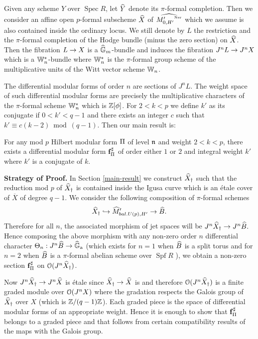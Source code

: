 \documentclass{amsart}
\def \hG{\widehat{\mathbb{G}}_{\mathrm{a}}}
\newcommand{\inj}{\hookrightarrow}
\newcommand{\ov}[1]{\overline{#1}}
\numberwithin{equation}{section}
\DeclareMathOperator{\Spec}{\mathrm{Spec}}
\DeclareMathOperator{\Spf}{\mathrm{Spf}}
\begin{document}
Given any scheme $Y$ over $\Spec R$, let 
$\widehat{Y}$ denote its $\pi$-formal completion. 
Then we consider an affine open $p$-formal subscheme $\widehat{X}$ of 
$\widehat{{M'_{0,H'}}^{\mbox{\tiny Ner}}}$ which we assume is also contained inside the ordinary locus.
We still denote by $L$ the restriction and the $\pi$-formal completion of 
the
Hodge bundle (minus the zero section) on $\widehat{X}$.  Then the fibration $L \rightarrow 
X$ is a $\widehat{\mathbb{G}}_m$-bundle and induces the fibration $J^nL \rightarrow J^nX$ which is a
$\mathbb{W}_n^*$-bundle where $\mathbb{W}_n^*$ is the $\pi$-formal group scheme of the
multiplicative units of the Witt vector scheme $\mathbb{W}_n$.

The differential modular forms of order $n$ are sections of $J^nL$. The 
weight space of such differential modular forms are precisely the 
multiplicative characters of the $\pi$-formal scheme $\mathbb{W}_n^*$ which is 
$\mathbb{Z}[\phi]$.
For $2 < k < p$ we define $k'$ as its conjugate if $0 < k' <q-1$ and there 
exists an integer $c$ such that $k' \equiv c(k-2) \bmod (q-1)$. Then our main 
result is:

\begin{theorem}
\label{main-thm-new}
For any mod $p$ Hilbert modular form $\Pi$ of level $\mathfrak{n}$ and weight 
$2 < k < p $,
there exists a differential modular form ${\bold f}^\sharp_{{\tiny \Pi}}$ of order either $1$ or $2$
and integral weight $k'$ where $k'$ is a conjugate of $k$.
\end{theorem}

{\bf Strategy of Proof.} 
In Section \ref{main-result} we construct $\widehat{X}_\dagger$ such that 
the reduction mod $p$ of $\widehat{X}_\dagger$ is contained inside the Igusa curve
which is an \'{e}tale cover of $\ov{X}$ of degree $q-1$. We
consider the following composition of $\pi$-formal schemes
\begin{equation}
\Xdag \inj \MU \map \wh{B}.
\end{equation}
Therefore for all $n$, the associated morphism of jet spaces will be
$J^n\widehat{X}_\dagger \rightarrow J^n \widehat{B}.$
Hence composing the above morphism with any non-zero order $n$ differential 
character $\Theta_n:J^n\wh{B} \map \hG$ (which exists for $n=1$ when $\widehat{B}$
is a split torus and for $n=2$ when $\widehat{B}$ is a $\pi$-formal abelian
scheme over $\Spf R$ \cite{MR1358979}),
we obtain a non-zero section ${\bold f}^\sharp_{{\tiny \Pi}}$ on $\mathcal{O}(J^n\widehat{X}_\dagger)$.

Now $J^n\widehat{X}_\dagger \rightarrow J^n\widehat{X}$ is \'{e}tale since $\widehat{X}_\dagger \rightarrow \widehat{X}$ is and 
therefore $\mathcal{O}(J^n\widehat{X}_\dagger)$ is a finite graded module over $\mathcal{O}(J^nX)$ where 
the gradation respects the Galois group of $\widehat{X}_\dagger$ over $X$ (which is 
$\mathbb{Z}/(q-1)\mathbb{Z}$). Each graded piece is the space of differential modular forms
of an appropriate weight. Hence it is enough to show that ${\bold f}^\sharp_{{\tiny \Pi}}$ belongs
to a graded piece and that follows from certain compatibility results of the
maps with the Galois group.
\end{document}
